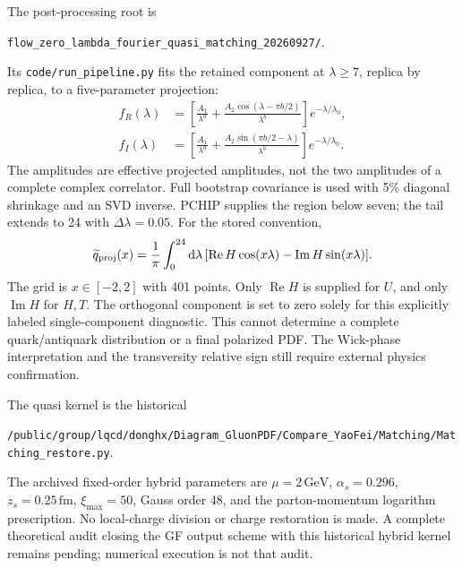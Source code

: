 \documentclass[11pt]{article}
\numberwithin{equation}{section}
\newcommand{\dd}{\mathrm{d}}
\begin{document}
The post-processing root is
\begin{center}
\nolinkurl{flow_zero_lambda_fourier_quasi_matching_20260927/}.
\end{center}
Its \texttt{code/run\_pipeline.py} fits the retained component at
\(\lambda\ge7\), replica by replica, to a five-parameter projection:
\begin{align}
 f_R(\lambda)&=\left[\frac{A_1}{\lambda^a}
    +\frac{A_2\cos(\lambda-\pi b/2)}{\lambda^b}\right]
                          e^{-\lambda/\lambda_0},\\
 f_I(\lambda)&=\left[\frac{A_1}{\lambda^a}
    +\frac{A_2\sin(\pi b/2-\lambda)}{\lambda^b}\right]
                          e^{-\lambda/\lambda_0}.
\end{align}
The amplitudes are effective projected amplitudes, not the two amplitudes
of a complete complex correlator. Full bootstrap covariance is used with
5\% diagonal shrinkage and an SVD inverse.
PCHIP supplies the region below seven; the tail extends to 24 with
\(\Delta\lambda=0.05\). For the stored convention,
\begin{equation}
 \widetilde q_{\rm proj}(x)
 =\frac1\pi\int_0^{24}\dd\lambda\,
 [\operatorname{Re}H\cos(x\lambda)
       -\operatorname{Im}H\sin(x\lambda)] .
 \label{eq:quark-single-component-fourier}
\end{equation}
The grid is \(x\in[-2,2]\) with 401 points.
Only \(\operatorname{Re}H\) is supplied for \(U\), and only
\(\operatorname{Im}H\) for \(H,T\).
The orthogonal component is set to zero solely for this explicitly labeled
single-component diagnostic. This cannot determine a complete quark/antiquark
distribution or a final polarized PDF. The Wick-phase interpretation and
the transversity relative sign still require external physics confirmation.

The quasi kernel is the historical
\begin{center}
\nolinkurl{/public/group/lqcd/donghx/Diagram_GluonPDF/Compare_YaoFei/Matching/Matching_restore.py}.
\end{center}
The archived fixed-order hybrid parameters are
\(\mu=2\,\mathrm{GeV}\), \(\alpha_s=0.296\),
\(z_s=0.25\,\mathrm{fm}\), \(\xi_{\max}=50\), Gauss order 48,
and the parton-momentum logarithm prescription.
No local-charge division or charge restoration is made.
A complete theoretical audit closing the GF output scheme with this
historical hybrid kernel remains pending; numerical execution is not that audit.
\end{document}
